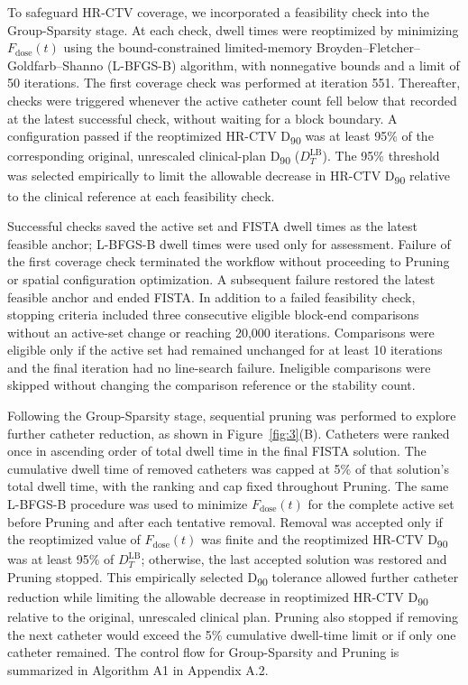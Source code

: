 \documentclass[12pt,twoside,letterpaper]{article}
\newcounter{algorithm}
\begin{document}
To safeguard HR-CTV coverage, we incorporated a feasibility check into the Group-Sparsity stage. At each check, dwell times were reoptimized by minimizing $F_{\text{dose}}\left( t \right)$ using the bound-constrained limited-memory Broyden--Fletcher--Goldfarb--Shanno (L-BFGS-B) algorithm,\cite{ref76,ref77} with nonnegative bounds and a limit of 50 iterations. The first coverage check was performed at iteration 551. Thereafter, checks were triggered whenever the active catheter count fell below that recorded at the latest successful check, without waiting for a block boundary. A configuration passed if the reoptimized HR-CTV D\textsubscript{90} was at least 95\% of the corresponding original, unrescaled clinical-plan D\textsubscript{90} ($D_{T}^{\text{LB}}$). The 95\% threshold was selected empirically to limit the allowable decrease in HR-CTV D\textsubscript{90} relative to the clinical reference at each feasibility check.

Successful checks saved the active set and FISTA dwell times as the latest feasible anchor; L-BFGS-B dwell times were used only for assessment. Failure of the first coverage check terminated the workflow without proceeding to Pruning or spatial configuration optimization. A subsequent failure restored the latest feasible anchor and ended FISTA. In addition to a failed feasibility check, stopping criteria included three consecutive eligible block-end comparisons without an active-set change or reaching 20,000 iterations. Comparisons were eligible only if the active set had remained unchanged for at least 10 iterations and the final iteration had no line-search failure. Ineligible comparisons were skipped without changing the comparison reference or the stability count.

Following the Group-Sparsity stage, sequential pruning was performed to explore further catheter reduction, as shown in Figure~\ref{fig:3}(B). Catheters were ranked once in ascending order of total dwell time in the final FISTA solution. The cumulative dwell time of removed catheters was capped at 5\% of that solution's total dwell time, with the ranking and cap fixed throughout Pruning. The same L-BFGS-B procedure was used to minimize $F_{\text{dose}}\left( t \right)$ for the complete active set before Pruning and after each tentative removal. Removal was accepted only if the reoptimized value of $F_{\text{dose}}\left( t \right)$ was finite and the reoptimized HR-CTV D\textsubscript{90} was at least 95\% of $D_{T}^{\text{LB}}$; otherwise, the last accepted solution was restored and Pruning stopped. This empirically selected D\textsubscript{90} tolerance allowed further catheter reduction while limiting the allowable decrease in reoptimized HR-CTV D\textsubscript{90} relative to the original, unrescaled clinical plan. Pruning also stopped if removing the next catheter would exceed the 5\% cumulative dwell-time limit or if only one catheter remained. The control flow for Group-Sparsity and Pruning is summarized in Algorithm A1 in Appendix A.2.
\end{document}
